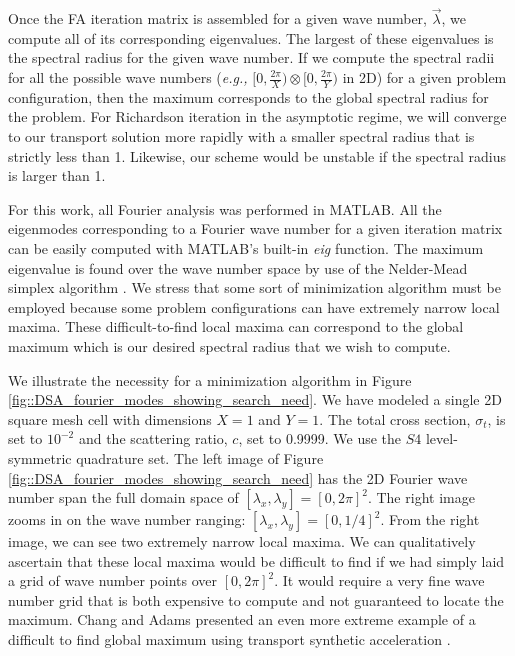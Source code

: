 Once the FA iteration matrix is assembled for a given wave number, $\vec{\lambda}$, we compute all of its corresponding eigenvalues. The largest of these eigenvalues is the spectral radius for the given wave number. If we compute the spectral radii for all the possible wave numbers ({\em e.g.,} $[0,\frac{2 \pi}{X}) \otimes [0,\frac{2 \pi}{Y})$ in 2D) for a given problem configuration, then the maximum corresponds to the global spectral radius for the problem. For Richardson iteration in the asymptotic regime, we will converge to our transport solution more rapidly with a smaller spectral radius that is strictly less than 1. Likewise, our scheme would be unstable if the spectral radius is larger than 1. 

For this work, all Fourier analysis was performed in MATLAB. All the eigenmodes corresponding to a Fourier wave number for a given iteration matrix can be easily computed with MATLAB's built-in {\em eig} function. The maximum eigenvalue is found over the wave number space by use of the Nelder-Mead simplex algorithm \cite{nelder1965simplex}. We stress that some sort of minimization algorithm must be employed because some problem configurations can have extremely narrow local maxima. These difficult-to-find local maxima can correspond to the global maximum which is our desired spectral radius that we wish to compute. 

We illustrate the necessity for a minimization algorithm in Figure \ref{fig::DSA_fourier_modes_showing_search_need}. We have modeled a single 2D square mesh cell with dimensions $X=1$ and $Y=1$. The total cross section, $\sigma_t$, is set to $10^{-2}$ and the scattering ratio, $c$, set to 0.9999. We use the $S4$ level-symmetric quadrature set. The left image of Figure \ref{fig::DSA_fourier_modes_showing_search_need} has the 2D Fourier wave number span the full domain space of $[\lambda_x,\lambda_y]=[0,2 \pi]^2$. The right image zooms in on the wave number ranging: $[\lambda_x,\lambda_y]=[0,1/4]^2$. From the right image, we can see two extremely narrow local maxima. We can qualitatively ascertain that these local maxima would be difficult to find if we had simply laid a grid of wave number points over $[0,2 \pi]^2$. It would require a very fine wave number grid that is both expensive to compute and not guaranteed to locate the maximum. Chang and Adams presented an even more extreme example of a difficult to find global maximum using transport synthetic acceleration \cite{chang2003analysis}.

